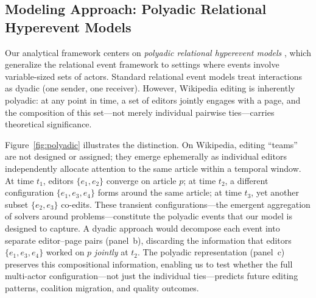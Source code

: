 \documentclass[11pt]{article}
\begin{document}
\FloatBarrier
\subsection{Modeling Approach: Polyadic Relational Hyperevent Models}

Our analytical framework centers on \emph{polyadic relational hyperevent models} \citep{Lerner2023}, which generalize the relational event framework \citep{Butts2008, Butts2009} to settings where events involve variable-sized sets of actors. Standard relational event models treat interactions as dyadic (one sender, one receiver). However, Wikipedia editing is inherently polyadic: at any point in time, a set of editors jointly engages with a page, and the composition of this set---not merely individual pairwise ties---carries theoretical significance.

Figure~\ref{fig:polyadic} illustrates the distinction. On Wikipedia, editing ``teams'' are not designed or assigned; they emerge ephemerally as individual editors independently allocate attention to the same article within a temporal window. At time $t_1$, editors $\{e_1, e_2\}$ converge on article $p$; at time $t_2$, a different configuration $\{e_1, e_3, e_4\}$ forms around the same article; at time $t_3$, yet another subset $\{e_2, e_3\}$ co-edits. These transient configurations---the emergent aggregation of solvers around problems---constitute the polyadic events that our model is designed to capture. A dyadic approach would decompose each event into separate editor--page pairs (panel~b), discarding the information that editors $\{e_1, e_3, e_4\}$ worked on $p$ \emph{jointly} at $t_2$. The polyadic representation (panel~c) preserves this compositional information, enabling us to test whether the full multi-actor configuration---not just the individual ties---predicts future editing patterns, coalition migration, and quality outcomes.
\end{document}
